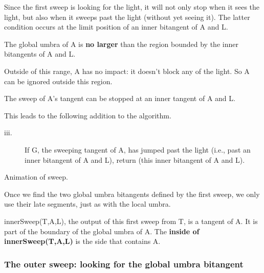 \documentclass[12pt]{article}
\begin{document}
Since the first sweep is looking for the light,
it will not only stop when it sees the light,
but also when it sweeps past the light (without yet seeing it).
The latter condition occurs at the 
limit position of an inner bitangent of A and L.

\begin{lemma}
\label{lem:umbraupperbd}
The global umbra of A is {\bf no larger} than the region
bounded by the inner bitangents of A and L.
\end{lemma}
\prf
Outside of this range, A has no impact: it doesn't block any of the light.
So A can be ignored outside this region.
\QED

\vspace{-.1in}

\begin{corollary}
The sweep of A's tangent can be stopped at an inner tangent of A and L.
\end{corollary}

This leads to the following addition to the algorithm.

\begin{description}
\item[iii.] If G, the sweeping tangent of A, has jumped past the light
 	(i.e., past an inner bitangent of A and L),
	return (this inner bitangent of A and L).
\end{description}

\begin{example}
Animation of sweep.
\end{example}

Once we find the two global umbra bitangents defined by the first sweep,
we only use their late segments,
just as with the local umbra.

\begin{defn2}
innerSweep(T,A,L), the output of this first sweep from T, is a tangent of A.
It is part of the boundary of the global umbra of A.
The {\bf inside of innerSweep(T,A,L)} is the side that contains A.
\end{defn2}


\subsubsection{The outer sweep: looking for the global umbra bitangent}
\end{document}
